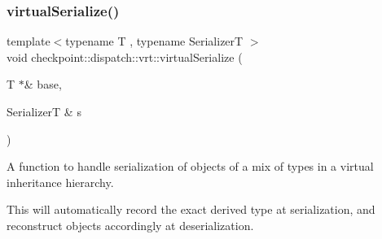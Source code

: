\mbox{\label{namespacecheckpoint_1_1dispatch_1_1vrt_ab62fa4e32b27853f6b57caf24b6a77cc}} 
\subsubsection{\texorpdfstring{virtual\+Serialize()}{virtualSerialize()}}
{\footnotesize\ttfamily template$<$typename T , typename SerializerT $>$ \\
void checkpoint\+::dispatch\+::vrt\+::virtual\+Serialize (\begin{DoxyParamCaption}\item[{T $\ast$\&}]{base,  }\item[{SerializerT \&}]{s }\end{DoxyParamCaption})}



A function to handle serialization of objects of a mix of types in a virtual inheritance hierarchy. 

This will automatically record the exact derived type at serialization, and reconstruct objects accordingly at deserialization. 